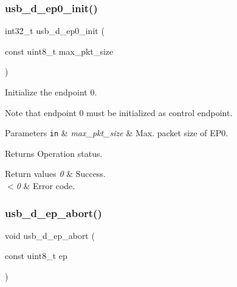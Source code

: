 \subsubsection{\texorpdfstring{usb\+\_\+d\+\_\+ep0\+\_\+init()}{usb\_d\_ep0\_init()}}
{\footnotesize\ttfamily int32\+\_\+t usb\+\_\+d\+\_\+ep0\+\_\+init (\begin{DoxyParamCaption}\item[{const uint8\+\_\+t}]{max\+\_\+pkt\+\_\+size }\end{DoxyParamCaption})}



Initialize the endpoint 0. 

Note that endpoint 0 must be initialized as control endpoint.


\begin{DoxyParams}[1]{Parameters}
\mbox{\tt in}  & {\em max\+\_\+pkt\+\_\+size} & Max. packet size of E\+P0. \\
\hline
\end{DoxyParams}
\begin{DoxyReturn}{Returns}
Operation status. 
\end{DoxyReturn}

\begin{DoxyRetVals}{Return values}
{\em 0} & Success. \\
\hline
{\em $<$0} & Error code. \\
\hline
\end{DoxyRetVals}
\mbox{\label{group__doc__driver__hal__usb__device_ga4d4de7ba6b356e5bbdd0ec37c2dac442}} 
\subsubsection{\texorpdfstring{usb\+\_\+d\+\_\+ep\+\_\+abort()}{usb\_d\_ep\_abort()}}
{\footnotesize\ttfamily void usb\+\_\+d\+\_\+ep\+\_\+abort (\begin{DoxyParamCaption}\item[{const uint8\+\_\+t}]{ep }\end{DoxyParamCaption})}



